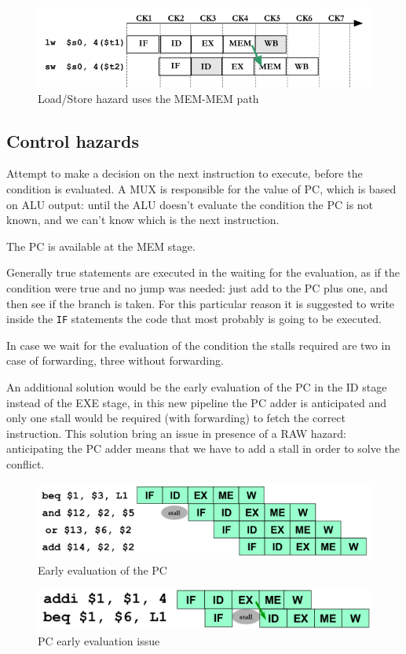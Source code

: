 \begin{figure}[h]
    \centering
    \includegraphics[scale=0.4]{images/load-store-hazard}
    \caption{Load/Store hazard uses the MEM-MEM path}
    \label{fig:load-store-hazard}
\end{figure}


\subsection{Control hazards}\label{subsec:control-hazards}
Attempt to make a decision on the next instruction to execute, before the condition is evaluated.
A MUX is responsible for the value of PC, which is based on ALU output: until the ALU doesn't evaluate the
condition the PC is not known, and we can't know which is the next instruction.

The PC is available at the MEM stage.

Generally true statements are executed in the waiting for the evaluation, as if the condition
were true and no jump was needed: just add to the PC plus one, and then see if the branch is taken.
For this particular reason it is suggested to write inside the \verb|IF| statements the code that most probably is
going to be executed.

In case we wait for the evaluation of the condition the stalls required are two in case of forwarding, three without forwarding.

An additional solution would be the early evaluation of the PC in the ID stage instead of the EXE stage, in this new
pipeline the PC adder is anticipated and only one stall would be required (with forwarding) to fetch the correct instruction.
This solution bring an issue in presence of a RAW hazard: anticipating the PC adder means that we have to add a stall
in order to solve the conflict.

\begin{figure}[h]
    \centering
    \includegraphics[scale = 0.4]{images/pc-early-evaluation}
    \caption{Early evaluation of the PC}
    \label{fig:pc-early-evaluation}
\end{figure}

\begin{figure}[h]
    \centering
    \includegraphics[scale = 0.4]{images/pc-early-evalutation-issue}
    \caption{PC early evaluation issue}
    \label{fig:pc-early-evaluation-issue}
\end{figure}